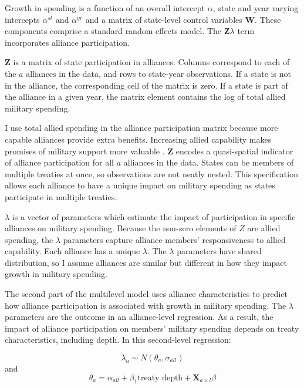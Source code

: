 \documentclass[12pt]{article}
\begin{document}
Growth in spending is a function of an overall intercept $\alpha$, state and year varying intercepts $\alpha^{st}$ and $\alpha^{yr}$ and a matrix of state-level control variables $\textbf{W}$.
These components comprise a standard random effects model. 
The $\textbf{Z} \lambda$ term incorporates alliance participation.


$\textbf{Z}$ is a matrix of state participation in alliances. 
Columns correspond to each of the $a$ alliances in the data, and rows to state-year observations. 
If a state is not in the alliance, the corresponding cell of the matrix is zero.
If a state is part of the alliance in a given year, the matrix element contains the log of total allied military spending.


I use total allied spending in the alliance participation matrix because more capable alliances provide extra benefits.
Increasing allied capability makes promises of military support more valuable \citep{Johnsonetal2015}. 
$\textbf{Z}$ encodes a quasi-spatial indicator of alliance participation for all $a$ alliances in the data. 
States can be members of multiple treaties at once, so observations are not neatly nested. 
This specification allows each alliance to have a unique impact on military spending as states participate in multiple treaties. 


$\lambda$ is a vector of parameters which estimate the impact of participation in specific alliances on military spending. 
Because the non-zero elements of $Z$ are allied spending, the $\lambda$ parameters capture alliance members' responsiveness to allied capability. 
Each alliance has a unique $\lambda$. 
The $\lambda$ parameters have shared distribution, so I assume alliances are similar but different in how they impact growth in military spending. 


The second part of the multilevel model uses alliance characteristics to predict how alliance participation is associated with growth in military spending. 
The $\lambda$ parameters are the outcome in an alliance-level regression.
As a result, the impact of alliance participation on members' military spending depends on treaty characteristics, including depth. 
In this second-level regression: 


\begin{equation}
\lambda_{a} \sim N(\theta_{a}, \sigma_{all})
\end{equation} 
and 
\begin{equation}
\theta_{a} = \alpha_{all} + \beta_1 \mbox{treaty depth} + \textbf{X}_{a \times l} \beta
\end{equation}
\end{document}
